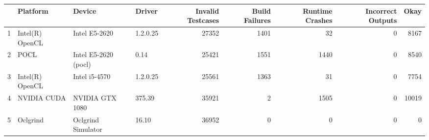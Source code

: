 \begin{tabular}{llllrrrrr}
\toprule
{} &         Platform &                Device &    Driver &  Invalid Testcases &  Build Failures &  Runtime Crashes &  Incorrect Outputs &   Okay \\
\midrule
1 &  Intel(R) OpenCL &         Intel E5-2620 &  1.2.0.25 &              27352 &            1401 &               32 &                  0 &   8167 \\
2 &             POCL &  Intel E5-2620 (pocl) &      0.14 &              25421 &            1551 &             1440 &                  0 &   8540 \\
3 &  Intel(R) OpenCL &         Intel i5-4570 &  1.2.0.25 &              25561 &            1363 &               31 &                  0 &   7754 \\
4 &      NVIDIA CUDA &       NVIDIA GTX 1080 &    375.39 &              35921 &               2 &             1505 &                  0 &  10019 \\
5 &         Oclgrind &    Oclgrind Simulator &     16.10 &              36952 &               0 &                0 &                  0 &      0 \\
\bottomrule
\end{tabular}

